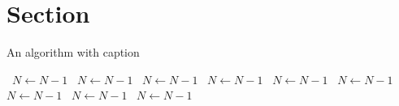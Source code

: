 \documentclass[a4paper]{article}
\begin{document}
\section{Section}

\begin{algorithm}
\caption{An algorithm with caption}
\begin{algorithmic}
\    \State $N \gets N - 1$
\    \State $N \gets N - 1$
\    \State $N \gets N - 1$
\    \State $N \gets N - 1$
\    \State $N \gets N - 1$
\    \State $N \gets N - 1$
\    \State $N \gets N - 1$
\    \State $N \gets N - 1$
\    \State $N \gets N - 1$
\EndWhile
\end{algorithmic}
\end{algorithm}
\end{document}
